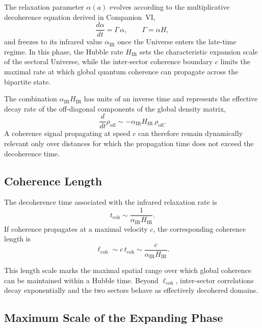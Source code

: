 \documentclass[11pt,a4paper]{article}
\begin{document}
The relaxation parameter $\alpha(a)$ evolves according to the multiplicative decoherence
equation derived in Companion~VI,
\begin{equation}
    \frac{d\alpha}{dt} = \Gamma\,\alpha, 
    \qquad \Gamma = \alpha H,
\end{equation}
and freezes to its infrared value $\alpha_{\mathrm{IR}}$ once the Universe enters the late-time
regime. In this phase, the Hubble rate $H_{\mathrm{IR}}$ sets the characteristic expansion scale
of the sectoral Universe, while the inter-sector coherence boundary $c$ limits the maximal
rate at which global quantum coherence can propagate across the bipartite state.

The combination $\alpha_{\mathrm{IR}} H_{\mathrm{IR}}$ has units of an inverse time and represents the
effective decay rate of the off-diagonal components of the global density matrix,
\begin{equation}
    \frac{d}{dt}\rho_{\mathrm{off}} 
    \sim - \alpha_{\mathrm{IR}} H_{\mathrm{IR}}\,\rho_{\mathrm{off}}.
\end{equation}
A coherence signal propagating at speed $c$ can therefore remain dynamically relevant only
over distances for which the propagation time does not exceed the decoherence time.

\subsection{Coherence Length}

The decoherence time associated with the infrared relaxation rate is
\begin{equation}
    t_{\mathrm{coh}} 
    \sim \frac{1}{\alpha_{\mathrm{IR}} H_{\mathrm{IR}}}.
\end{equation}
If coherence propagates at a maximal velocity $c$, the corresponding coherence length is
\begin{equation}
    \ell_{\mathrm{coh}}
    \sim c\,t_{\mathrm{coh}}
    \sim \frac{c}{\alpha_{\mathrm{IR}} H_{\mathrm{IR}}}.
\end{equation}

This length scale marks the maximal spatial range over which global coherence can be
maintained within a Hubble time. Beyond $\ell_{\mathrm{coh}}$, inter-sector correlations decay
exponentially and the two sectors behave as effectively decohered domains.

\subsection{Maximum Scale of the Expanding Phase}
\end{document}
